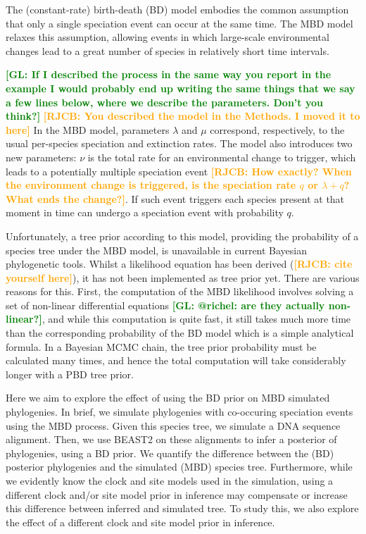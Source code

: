 \documentclass{article}
\newcommand*\richel[1]{\textcolor{orange}{\textbf{[RJCB: #1]}}}
\newcommand*\gio[1]{\textcolor{green}{\textbf{[GL: #1]}}}
\begin{document}
The (constant-rate) birth-death (BD) model embodies the common assumption that 
only a single speciation event can occur at the same time.
The MBD model relaxes this assumption, allowing events in which 
large-scale environmental changes lead to a great number of species 
in relatively short time intervals. 

\gio{If I described the process in the same way you report in the example I would probably end up writing the same things that we say a few lines below, where we describe the parameters. Don't you think?}
\richel{You described the model in the Methods. I moved it to here}
In the MBD model, parameters $\lambda$ and $\mu$ correspond, respectively, 
to the usual per-species speciation and extinction rates. 
The model also introduces two new parameters: 
$\nu$ is the total rate for an environmental change to trigger, 
which leads to a potentially multiple speciation event 
\richel{How exactly? When the environment change is triggered, is the speciation rate $q$ or $\lambda + q$? What ends the change?}.
If such event triggers each species present at that moment in time can undergo a speciation event with probability $q$.

Unfortunately, a tree prior according to this model, 
providing the probability of a species tree under the MBD model, 
is unavailable in current Bayesian phylogenetic tools. 
Whilst a likelihood equation has been derived (\richel{cite yourself here}),
it has not been implemented as tree prior yet. 
There are various reasons for this.
First, the computation of the MBD likelihood involves solving a set of 
non-linear differential equations \gio{@richel: are they actually non-linear?}, and while this computation is quite fast, 
it still takes much more time than the corresponding probability 
of the BD model which is a simple analytical formula. 
In a Bayesian MCMC chain, the tree prior probability must be calculated many times, 
and hence the total computation will take considerably longer with a PBD tree prior. 

Here we aim to explore the effect of using the
BD prior on MBD simulated phylogenies.
In brief, we simulate phylogenies with co-occuring speciation events using the MBD process. 
Given this species tree, we simulate a DNA sequence alignment. Then, we use BEAST2 on these alignments
to infer a posterior of phylogenies, using a BD prior. We quantify the difference
between the (BD) posterior phylogenies and the simulated (MBD) species tree.
Furthermore, while we evidently know the clock and site models used in the simulation, 
using a different clock and/or site model prior in inference 
may compensate or increase this difference between inferred and simulated tree. 
To study this, we also explore the effect of 
a different clock and site model prior in inference.
\end{document}
